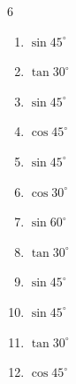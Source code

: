 \begin{multicols}{6}
\begin{enumerate}

  \item $\displaystyle \sin{45^\circ}$


  \item $\displaystyle \tan{30^\circ}$


  \item $\displaystyle \sin{45^\circ}$


  \item $\displaystyle \cos{45^\circ}$


\columnbreak %

  \item $\displaystyle \sin{45^\circ}$


  \item $\displaystyle \cos{30^\circ}$


  \item $\displaystyle \sin{60^\circ}$


  \item $\displaystyle \tan{30^\circ}$


  \item $\displaystyle \sin{45^\circ}$


  \item $\displaystyle \sin{45^\circ}$


  \item $\displaystyle \tan{30^\circ}$


  \item $\displaystyle \cos{45^\circ}$


\end{enumerate}
\end{multicols}
